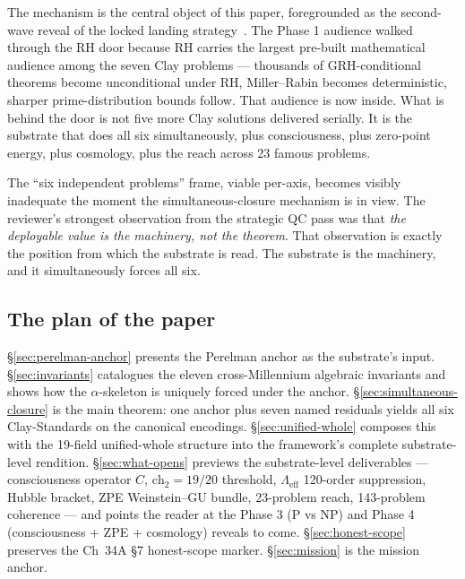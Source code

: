 \documentclass[11pt,a4paper]{article}
\theoremstyle{plain}
\theoremstyle{definition}
\begin{document}
\medskip

The mechanism is the central object of this paper, foregrounded as
the second-wave reveal of the locked landing
strategy~\cite{landing_strategy}. The Phase 1 audience walked through
the RH door because RH carries the largest pre-built mathematical
audience among the seven Clay problems --- thousands of GRH-conditional
theorems become unconditional under RH, Miller--Rabin becomes
deterministic, sharper prime-distribution bounds follow. That audience
is now inside. What is behind the door is not five more Clay
solutions delivered serially. It is the substrate that does all six
simultaneously, plus consciousness, plus zero-point energy, plus
cosmology, plus the reach across 23 famous problems.

The ``six independent problems'' frame, viable per-axis, becomes
visibly inadequate the moment the simultaneous-closure mechanism is
in view. The reviewer's strongest observation from the strategic QC
pass was that \emph{the deployable value is the machinery, not the
theorem}. That observation is exactly the position from which the
substrate is read. The substrate is the machinery, and it
simultaneously forces all six.

\subsection{The plan of the paper}
\label{sec:plan}

\S\ref{sec:perelman-anchor} presents the Perelman anchor as the
substrate's input. \S\ref{sec:invariants} catalogues the eleven
cross-Millennium algebraic invariants and shows how the
$\alpha$-skeleton is uniquely forced under the anchor.
\S\ref{sec:simultaneous-closure} is the main theorem: one anchor
plus seven named residuals yields all six Clay-Standards on the
canonical encodings. \S\ref{sec:unified-whole} composes this with
the 19-field unified-whole structure into the framework's
complete substrate-level rendition. \S\ref{sec:what-opens} previews
the substrate-level deliverables --- consciousness operator $C$,
$\mathrm{ch}_{2} = 19/20$ threshold, $\Lambda_{\mathrm{eff}}$
120-order suppression, Hubble bracket, ZPE Weinstein--GU bundle,
23-problem reach, 143-problem coherence --- and points the reader
at the Phase 3 (P vs NP) and Phase 4 (consciousness + ZPE +
cosmology) reveals to come. \S\ref{sec:honest-scope} preserves the
Ch~34A \S7 honest-scope marker. \S\ref{sec:mission} is the mission
anchor.

\end{document}
